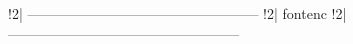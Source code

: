 !2| --------------------------------------------------
!2| {fontenc}
!2| --------------------------------------------------

\usepackage[T1]{fontenc} 
